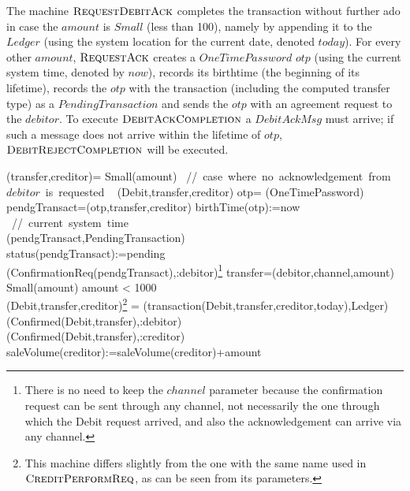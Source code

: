 The machine  $\hbox{\sc RequestDebitAck}$ completes the transaction without further 
ado in case  the
$amount$ is $Small$ (less than 100), namely by appending it to the $Ledger$ (using the system location for the current date, denoted $today$). For every other $amount$, $\hbox{\sc RequestAck}$
creates a $OneTimePassword$ $otp$ (using the current system time, denoted by $now$), records its birthtime (the beginning of its lifetime), records the $otp$ with the transaction (including the computed transfer type) as a $PendingTransaction$ and sends the $otp$  with an agreement request to the $debitor$. To execute 
$\hbox{\sc DebitAckCompletion}$ a $DebitAckMsg$ must arrive; if such a message does not arrive within the lifetime of $otp$, $\hbox{\sc DebitRejectCompletion}$ will be executed.

\begin{asm}
(transfer,creditor)=\+
\IF Small(amount) 
\mbox{  // case where no acknowledgement from $debitor$ is requested}\+
   \THEN ~ (Debit,transfer,creditor) \-
   \ELSE \+
       \LET otp= \NEW(OneTimePassword)\\
       \LET pendgTransact=(otp,transfer,creditor)\+
          birthTime(otp):=now \mbox{ // current system time}\\
          (pendgTransact,PendingTransaction)\\ 
          status(pendgTransact):=pending \\
          (ConfirmationReq(pendgTransact),\TO :debitor)\footnote{There is no need to keep the $channel$ parameter because the confirmation request can be sent through any channel, not necessarily the one through which the Debit request arrived, and also the acknowledgement can arrive via any channel.}
       \dec\-
\WHERE \+
transfer=(debitor,channel,amount)\\
Small(amount) \IFF amount < 1000 \\
 (Debit,transfer,creditor)\footnote{This machine differs slightly from the one with the same name used in $\hbox{\sc CreditPerformReq}$, as can be seen from its parameters.} =\+     
   (transaction(Debit,transfer,creditor,today),Ledger)\\
   (Confirmed(Debit,transfer),\TO :debitor)\\
   (Confirmed(Debit,transfer),\TO :creditor)\\
   saleVolume(creditor):=saleVolume(creditor)+amount
\end{asm}


